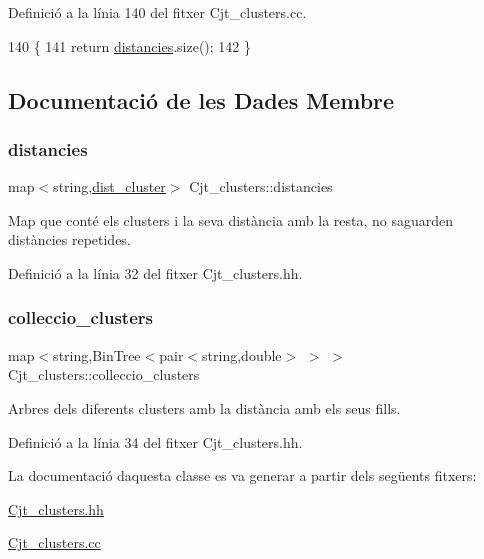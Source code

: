 Definició a la línia 140 del fitxer Cjt\+\_\+clusters.\+cc.


\begin{DoxyCode}
140                                     \{
141     \textcolor{keywordflow}{return} \hyperlink{class_cjt__clusters_a8e94e53830e3224d791dcf7dbd0a6082}{distancies}.size();
142 \}
\end{DoxyCode}


\subsection{Documentació de les Dades Membre}
\mbox{\label{class_cjt__clusters_a8e94e53830e3224d791dcf7dbd0a6082}} 
\subsubsection{\texorpdfstring{distancies}{distancies}}
{\footnotesize\ttfamily map$<$string,\hyperlink{class_cjt__clusters_a9138a363184004ad38221f340abfccd5}{dist\+\_\+cluster}$>$ Cjt\+\_\+clusters\+::distancies\hspace{0.3cm}{\ttfamily [private]}}



Map que conté els clusters i la seva distància amb la resta, no s\textquotesingle{}aguarden distàncies repetides. 



Definició a la línia 32 del fitxer Cjt\+\_\+clusters.\+hh.

\mbox{\label{class_cjt__clusters_aea7d6362517dd16cbd12736a3da50021}} 
\subsubsection{\texorpdfstring{colleccio\+\_\+clusters}{colleccio\_clusters}}
{\footnotesize\ttfamily map$<$string,Bin\+Tree$<$pair$<$string,double$>$ $>$ $>$ Cjt\+\_\+clusters\+::colleccio\+\_\+clusters\hspace{0.3cm}{\ttfamily [private]}}



Arbres dels diferents clusters amb la distància amb els seus fills. 



Definició a la línia 34 del fitxer Cjt\+\_\+clusters.\+hh.



La documentació d\textquotesingle{}aquesta classe es va generar a partir dels següents fitxers\+:\begin{DoxyCompactItemize}
\item 
\hyperlink{_cjt__clusters_8hh}{Cjt\+\_\+clusters.\+hh}\item 
\hyperlink{_cjt__clusters_8cc}{Cjt\+\_\+clusters.\+cc}\end{DoxyCompactItemize}
